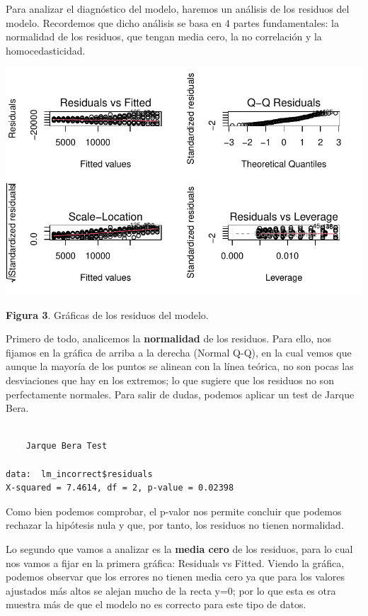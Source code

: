 \documentclass[
  letterpaper,
  DIV=11,
  numbers=noendperiod]{scrreprt}
\begin{document}
Para analizar el diagnóstico del modelo, haremos un análisis de los
residuos del modelo. Recordemos que dicho análisis se basa en 4 partes
fundamentales: la normalidad de los residuos, que tengan media cero, la
no correlación y la homocedasticidad.

\includegraphics{cap2_files/figure-pdf/unnamed-chunk-5-1.pdf}

\textbf{Figura 3}. Gráficas de los residuos del modelo.

Primero de todo, analicemos la \textbf{normalidad} de los residuos. Para
ello, nos fijamos en la gráfica de arriba a la derecha (Normal Q-Q), en
la cual vemos que aunque la mayoría de los puntos se alinean con la
línea teórica, no son pocas las desviaciones que hay en los extremos; lo
que sugiere que los residuos no son perfectamente normales. Para salir
de dudas, podemos aplicar un test de Jarque Bera.

\begin{verbatim}

    Jarque Bera Test

data:  lm_incorrect$residuals
X-squared = 7.4614, df = 2, p-value = 0.02398
\end{verbatim}

Como bien podemos comprobar, el p-valor nos permite concluir que podemos
rechazar la hipótesis nula y que, por tanto, los residuos no tienen
normalidad.

Lo segundo que vamos a analizar es la \textbf{media cero} de los
residuos, para lo cual nos vamos a fijar en la primera gráfica:
Residuals vs Fitted. Viendo la gráfica, podemos observar que los errores
no tienen media cero ya que para los valores ajustados más altos se
alejan mucho de la recta y=0; por lo que esta es otra muestra más de que
el modelo no es correcto para este tipo de datos.
\end{document}

